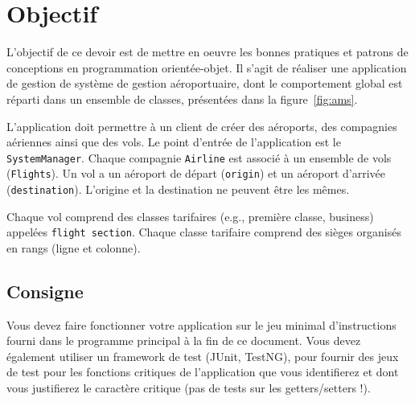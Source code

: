 \documentclass[a4paper,12pt,francais,twoside]{article}
\begin{document}
\graphicspath{{../images/}}





\section{Objectif}

L'objectif de ce devoir est de mettre en oeuvre les bonnes pratiques et patrons de conceptions
en programmation orientée-objet. Il s'agit de réaliser une application de gestion de système de gestion aéroportuaire, dont le comportement global est réparti dans un ensemble de classes,
présentées dans la figure~\ref{fig:ams}.

L'application doit permettre à un client de créer des aéroports, des 
compagnies aériennes ainsi que des vols. Le point d'entrée de l'application
est le \texttt{SystemManager}. Chaque compagnie \texttt{Airline} est associé
à  un ensemble de vols (\texttt{Flights}). Un vol a un aéroport de départ 
(\texttt{origin}) et un aéroport d'arrivée (\texttt{destination}). 
L'origine et la destination ne peuvent être les mêmes. 

Chaque vol comprend des classes tarifaires (e.g., première classe, business)
appelées \texttt{flight section}. Chaque classe tarifaire comprend des 
sièges organisés en rangs (ligne et colonne).

\subsection{Consigne}
Vous devez faire fonctionner votre application sur le jeu minimal d'instructions
fourni dans le programme principal à la fin de ce document. 
Vous devez également utiliser un framework de test (JUnit, TestNG), pour 
fournir des jeux de test pour les fonctions critiques de l'application que vous identifierez
et dont vous justifierez le caractère critique (pas de tests sur les getters/setters !).
\end{document}
